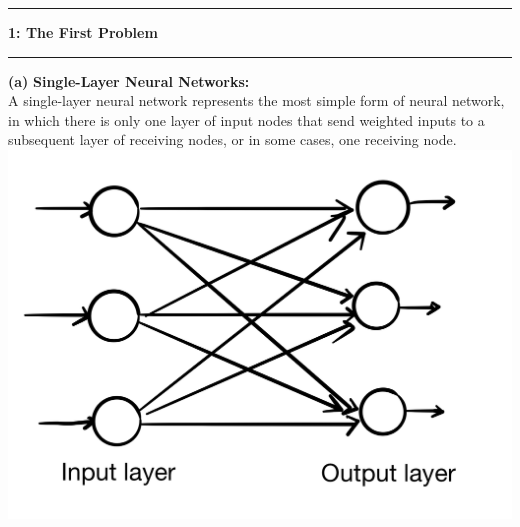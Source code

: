 \documentclass[11pt]{article}
\newcommand\question[2]{\vspace{.25in}\hrule\textbf{#1: #2}\vspace{.5em}\hrule\vspace{.10in}}
\renewcommand\part[1]{\vspace{.10in}\textbf{(#1)}}
\newcommand\singlelayer{\vspace{.10in}\textbf{Single-Layer Neural Networks: }}
\begin{document}
\raggedright
\newcommand\NAME{Yao Xiao}  %
\newcommand\ANDREWID{2019180015}     %
\newcommand\HWNUM{1}              %


\question{1}{The First Problem} 

\part{a} \singlelayer \\A single-layer neural network represents the most simple form of neural network, in which there is only one layer of input nodes that send weighted inputs to a subsequent layer of receiving nodes, or in some cases, one receiving node.\\
\includegraphics[scale=0.15]{sl.jpeg}
\end{document}
